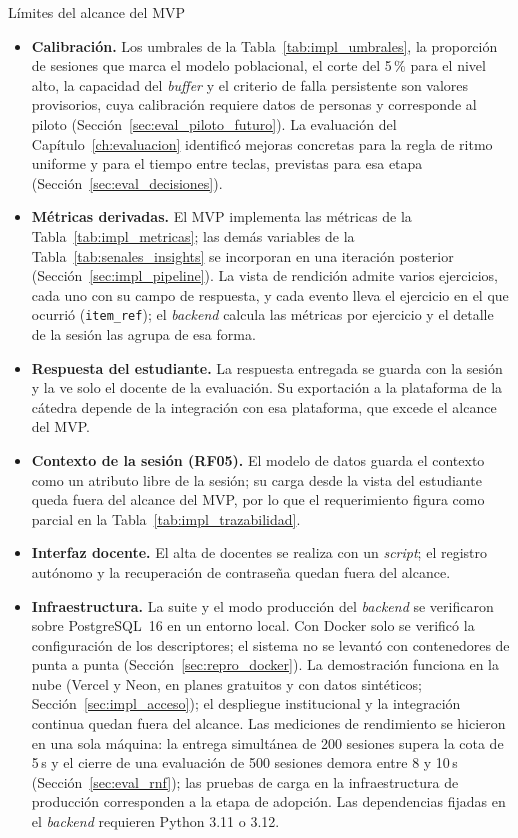 \begin{opendecision}{Límites del alcance del MVP}
\begin{itemize}
    \item \textbf{Calibración.} Los umbrales de la Tabla~\ref{tab:impl_umbrales}, la proporción de sesiones que marca el modelo poblacional, el corte del 5\,\% para el nivel alto, la capacidad del \textit{buffer} y el criterio de falla persistente son valores provisorios, cuya calibración requiere datos de personas y corresponde al piloto (Sección~\ref{sec:eval_piloto_futuro}). La evaluación del Capítulo~\ref{ch:evaluacion} identificó mejoras concretas para la regla de ritmo uniforme y para el tiempo entre teclas, previstas para esa etapa (Sección~\ref{sec:eval_decisiones}).
    \item \textbf{Métricas derivadas.} El MVP implementa las métricas de la Tabla~\ref{tab:impl_metricas}; las demás variables de la Tabla~\ref{tab:senales_insights} se incorporan en una iteración posterior (Sección~\ref{sec:impl_pipeline}). La vista de rendición admite varios ejercicios, cada uno con su campo de respuesta, y cada evento lleva el ejercicio en el que ocurrió (\texttt{item\_ref}); el \textit{backend} calcula las métricas por ejercicio y el detalle de la sesión las agrupa de esa forma.
    \item \textbf{Respuesta del estudiante.} La respuesta entregada se guarda con la sesión y la ve solo el docente de la evaluación. Su exportación a la plataforma de la cátedra depende de la integración con esa plataforma, que excede el alcance del MVP.
    \item \textbf{Contexto de la sesión (RF05).} El modelo de datos guarda el contexto como un atributo libre de la sesión; su carga desde la vista del estudiante queda fuera del alcance del MVP, por lo que el requerimiento figura como parcial en la Tabla~\ref{tab:impl_trazabilidad}.
    \item \textbf{Interfaz docente.} El alta de docentes se realiza con un \textit{script}; el registro autónomo y la recuperación de contraseña quedan fuera del alcance.
    \item \textbf{Infraestructura.} La suite y el modo producción del \textit{backend} se verificaron sobre PostgreSQL~16 en un entorno local. Con Docker solo se verificó la configuración de los descriptores; el sistema no se levantó con contenedores de punta a punta (Sección~\ref{sec:repro_docker}). La demostración funciona en la nube (Vercel y Neon, en planes gratuitos y con datos sintéticos; Sección~\ref{sec:impl_acceso}); el despliegue institucional y la integración continua quedan fuera del alcance. Las mediciones de rendimiento se hicieron en una sola máquina: la entrega simultánea de 200 sesiones supera la cota de 5\,s y el cierre de una evaluación de 500 sesiones demora entre 8 y 10\,s (Sección~\ref{sec:eval_rnf}); las pruebas de carga en la infraestructura de producción corresponden a la etapa de adopción. Las dependencias fijadas en el \textit{backend} requieren Python 3.11 o 3.12.

\end{itemize}
\end{opendecision}
